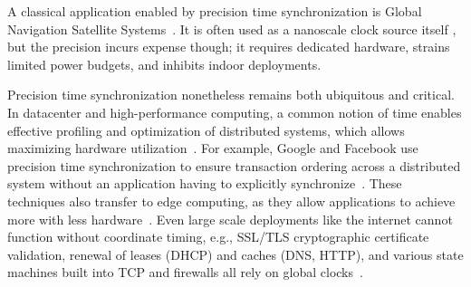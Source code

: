 A classical application enabled by precision time synchronization
is Global Navigation Satellite Systems~\cite{intro-to-gnss}.
It is often used as a nanoscale clock source itself %
\cite{gnss-location-and-time-advances,gnss-for-high-precision-timing},
but the precision incurs expense though; it requires dedicated hardware, strains limited power budgets, and inhibits indoor deployments.

Precision time synchronization nonetheless remains both ubiquitous and critical.
In datacenter and high-performance computing,
a common notion of time enables effective profiling and optimization of distributed systems,
which allows maximizing hardware utilization~\cite{hpc-understanding-bottlenecks, hpc-solving-io-bottleneck, hpc-diagnosing-io-bottlenecks}.
For example, Google and Facebook use precision time synchronization to ensure transaction ordering across a distributed system without an application having to explicitly synchronize~\cite{corbett2013spanner,li2020sundial,ouellete2023precision}.
These techniques also transfer to edge computing, as they allow applications to achieve more with less hardware~\cite{chen2021achieving, wang2019frame}.
Even large scale deployments like the internet cannot function without coordinate timing,
e.g., SSL/TLS cryptographic certificate validation, renewal of leases (DHCP) and caches (DNS, HTTP), and various state machines built into TCP and firewalls all rely on global clocks~\cite{TODO}.

